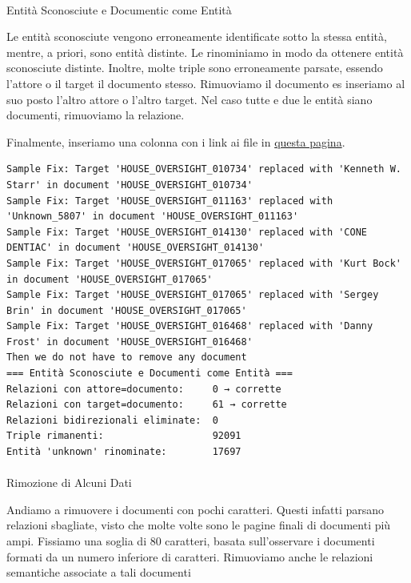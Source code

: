 \documentclass[
  italian,
  a4paper,
]{article}
\makeatletter
\let\oldparagraph\paragraph
\renewcommand{\paragraph}{
    \@ifstar
      \xxxParagraphStar
      \xxxParagraphNoStar
  }
\newcommand{\xxxParagraphStar}[1]{\oldparagraph*{#1}\mbox{}}
\newcommand{\xxxParagraphNoStar}[1]{\oldparagraph{#1}\mbox{}}
\makeatother
\begin{document}
\paragraph{Entità Sconosciute e Documentic come
Entità}\label{entituxe0-sconosciute-e-documentic-come-entituxe0}

Le entità sconosciute vengono erroneamente identificate sotto la stessa
entità, mentre, a priori, sono entità distinte. Le rinominiamo in modo
da ottenere entità sconosciute distinte. Inoltre, molte triple sono
erroneamente parsate, essendo l'attore o il target il documento stesso.
Rimuoviamo il documento es inseriamo al suo posto l'altro attore o
l'altro target. Nel caso tutte e due le entità siano documenti,
rimuoviamo la relazione.

Finalmente, inseriamo una colonna con i link ai file in
\href{https://epsteingraph.com/}{questa pagina}.

\begin{verbatim}
Sample Fix: Target 'HOUSE_OVERSIGHT_010734' replaced with 'Kenneth W. Starr' in document 'HOUSE_OVERSIGHT_010734'
Sample Fix: Target 'HOUSE_OVERSIGHT_011163' replaced with 'Unknown_5807' in document 'HOUSE_OVERSIGHT_011163'
Sample Fix: Target 'HOUSE_OVERSIGHT_014130' replaced with 'CONE DENTIAC' in document 'HOUSE_OVERSIGHT_014130'
Sample Fix: Target 'HOUSE_OVERSIGHT_017065' replaced with 'Kurt Bock' in document 'HOUSE_OVERSIGHT_017065'
Sample Fix: Target 'HOUSE_OVERSIGHT_017065' replaced with 'Sergey Brin' in document 'HOUSE_OVERSIGHT_017065'
Sample Fix: Target 'HOUSE_OVERSIGHT_016468' replaced with 'Danny Frost' in document 'HOUSE_OVERSIGHT_016468'
Then we do not have to remove any document
=== Entità Sconosciute e Documenti come Entità ===
Relazioni con attore=documento:     0 → corrette
Relazioni con target=documento:     61 → corrette
Relazioni bidirezionali eliminate:  0
Triple rimanenti:                   92091
Entità 'unknown' rinominate:        17697
\end{verbatim}

\paragraph{Rimozione di Alcuni Dati}\label{rimozione-di-alcuni-dati}

Andiamo a rimuovere i documenti con pochi caratteri. Questi infatti
parsano relazioni sbagliate, visto che molte volte sono le pagine finali
di documenti più ampi. Fissiamo una soglia di 80 caratteri, basata
sull'osservare i documenti formati da un numero inferiore di caratteri.
Rimuoviamo anche le relazioni semantiche associate a tali documenti
\end{document}
